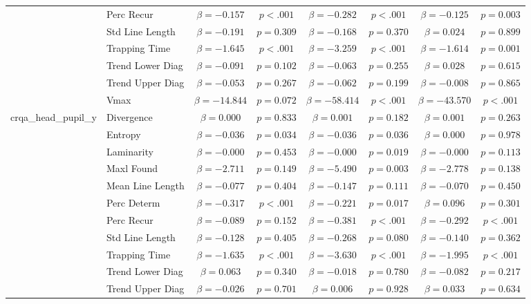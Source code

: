 \begin{tabular}{llcc|cc|cc}
 & Perc Recur & $\beta = -0.157$ & $p < .001$ & $\beta = -0.282$ & $p < .001$ & $\beta = -0.125$ & $p = 0.003$ \\
 & Std Line Length & $\beta = -0.191$ & $p = 0.309$ & $\beta = -0.168$ & $p = 0.370$ & $\beta = 0.024$ & $p = 0.899$ \\
 & Trapping Time & $\beta = -1.645$ & $p < .001$ & $\beta = -3.259$ & $p < .001$ & $\beta = -1.614$ & $p = 0.001$ \\
 & Trend Lower Diag & $\beta = -0.091$ & $p = 0.102$ & $\beta = -0.063$ & $p = 0.255$ & $\beta = 0.028$ & $p = 0.615$ \\
 & Trend Upper Diag & $\beta = -0.053$ & $p = 0.267$ & $\beta = -0.062$ & $p = 0.199$ & $\beta = -0.008$ & $p = 0.865$ \\
 & Vmax & $\beta = -14.844$ & $p = 0.072$ & $\beta = -58.414$ & $p < .001$ & $\beta = -43.570$ & $p < .001$ \\
\midrule
\multirow{12}{*}{crqa_head_pupil_y} & Divergence & $\beta = 0.000$ & $p = 0.833$ & $\beta = 0.001$ & $p = 0.182$ & $\beta = 0.001$ & $p = 0.263$ \\
 & Entropy & $\beta = -0.036$ & $p = 0.034$ & $\beta = -0.036$ & $p = 0.036$ & $\beta = 0.000$ & $p = 0.978$ \\
 & Laminarity & $\beta = -0.000$ & $p = 0.453$ & $\beta = -0.000$ & $p = 0.019$ & $\beta = -0.000$ & $p = 0.113$ \\
 & Maxl Found & $\beta = -2.711$ & $p = 0.149$ & $\beta = -5.490$ & $p = 0.003$ & $\beta = -2.778$ & $p = 0.138$ \\
 & Mean Line Length & $\beta = -0.077$ & $p = 0.404$ & $\beta = -0.147$ & $p = 0.111$ & $\beta = -0.070$ & $p = 0.450$ \\
 & Perc Determ & $\beta = -0.317$ & $p < .001$ & $\beta = -0.221$ & $p = 0.017$ & $\beta = 0.096$ & $p = 0.301$ \\
 & Perc Recur & $\beta = -0.089$ & $p = 0.152$ & $\beta = -0.381$ & $p < .001$ & $\beta = -0.292$ & $p < .001$ \\
 & Std Line Length & $\beta = -0.128$ & $p = 0.405$ & $\beta = -0.268$ & $p = 0.080$ & $\beta = -0.140$ & $p = 0.362$ \\
 & Trapping Time & $\beta = -1.635$ & $p < .001$ & $\beta = -3.630$ & $p < .001$ & $\beta = -1.995$ & $p < .001$ \\
 & Trend Lower Diag & $\beta = 0.063$ & $p = 0.340$ & $\beta = -0.018$ & $p = 0.780$ & $\beta = -0.082$ & $p = 0.217$ \\
 & Trend Upper Diag & $\beta = -0.026$ & $p = 0.701$ & $\beta = 0.006$ & $p = 0.928$ & $\beta = 0.033$ & $p = 0.634$ \\

\end{tabular}
